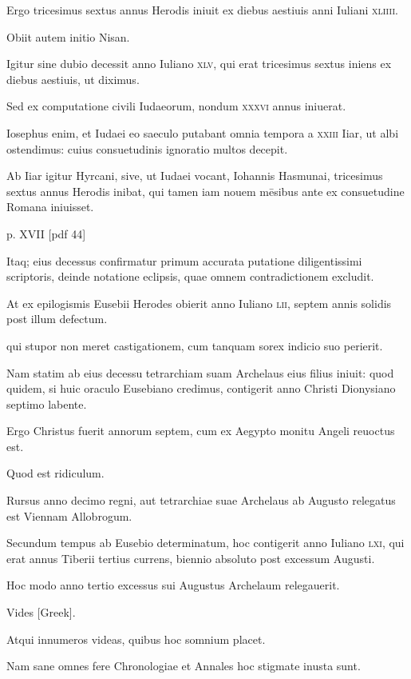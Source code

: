 \begin{parnumbers}
Ergo tricesimus sextus annus Herodis iniuit ex diebus aestiuis anni
Iuliani \textsc{xliiii}.

Obiit autem initio Nisan.

Igitur sine dubio decessit
anno Iuliano \textsc{xlv}, qui erat tricesimus sextus iniens ex diebus aestiuis,
ut diximus.

Sed ex computatione civili Iudaeorum, nondum
\textsc{xxxvi} annus iniuerat.

Iosephus enim, et Iudaei eo saeculo putabant
omnia tempora a \textsc{xxiii} Iiar, ut albi ostendimus: cuius consuetudinis
ignoratio multos decepit.

Ab Iiar igitur Hyrcani, sive, ut Iudaei
vocant, Iohannis Hasmunai, tricesimus sextus annus Herodis inibat,
qui tamen iam nouem mēsibus ante ex consuetudine Romana iniuisset.

\clearpage
p. XVII [pdf 44]

Itaq; eius decessus confirmatur primum accurata putatione
diligentissimi scriptoris, deinde notatione eclipsis, quae omnem contradictionem
excludit.

At ex epilogismis Eusebii Herodes obierit
anno Iuliano \textsc{lii}, septem annis solidis post illum defectum.

qui stupor non meret castigationem, cum tanquam sorex indicio suo perierit.

Nam statim ab eius decessu tetrarchiam suam Archelaus eius filius
iniuit: quod quidem, si huic oraculo Eusebiano credimus, contigerit
anno Christi Dionysiano septimo labente.

Ergo Christus fuerit
annorum septem, cum ex Aegypto monitu Angeli reuoctus est.

Quod est ridiculum.

Rursus anno decimo regni, aut tetrarchiae suae
Archelaus ab Augusto relegatus est Viennam Allobrogum.

Secundum tempus ab Eusebio determinatum, hoc contigerit anno Iuliano
\textsc{lxi}, qui erat annus Tiberii tertius currens, biennio absoluto
post excessum Augusti.

Hoc modo anno tertio excessus sui Augustus
Archelaum relegauerit.

Vides \textgreek{[Greek]}.

Atqui innumeros videas,
quibus hoc somnium placet.

Nam sane omnes fere Chronologiae
et Annales hoc stigmate inusta sunt.


\end{parnumbers}
